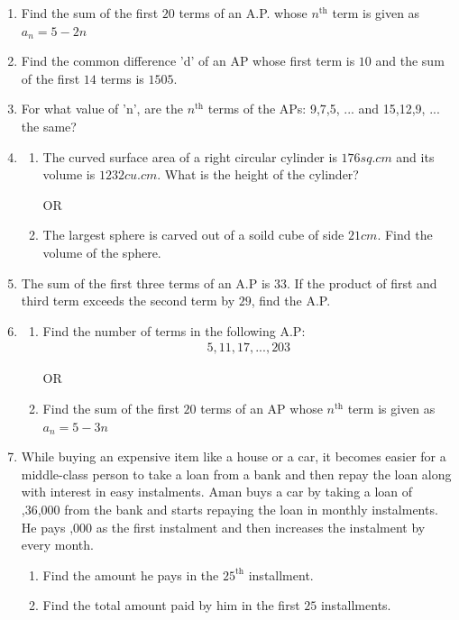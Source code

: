 \documentclass{article}
\begin{document}
\begin{enumerate}
    
        \item Find the sum of the first $20$ terms of an A.P. whose $n^{\text{th}}$ term is given as $a_n=5-2n$
    
    
        \item Find the common difference 'd' of an AP whose first term is $1$0 and the sum of the first $14$ terms is $1505$.

        \item For what value of 'n', are the $n^{\text{th}}$ terms of the APs: 9,7,5, ... and 15,12,9, ... the same?

        \item
        \begin{enumerate}
            \item The curved surface area of a right circular cylinder is $176 sq.cm$ and its volume is $1232cu. cm$. What is the height of the cylinder?
            \begin{center}
            OR
        \end{center} 
        \item The largest sphere is carved out of a soild cube of side $21 cm$. Find the volume of the sphere.
        \end{enumerate}
        \item The sum of the first three terms of an A.P is $33$. If the product of first and third term exceeds the second term by $29$, find the A.P.
            
         \item
        \begin{enumerate}
            \item Find the number of terms in the following A.P:
            \begin{align}
                5,11,17,...,203
            \end{align}
            \begin{center}
            OR
        \end{center} 
        \item Find the sum of the first $20$ terms of an AP whose $n^{\text{th}}$ term is given as $a_n=5-3n$
        \end{enumerate}

        \item While buying an expensive item like a house or a car, it becomes easier for a middle-class person to take a loan from a bank and then repay the loan along with interest in easy instalments. 
        Aman buys a car by taking a loan of ,36,000 from the bank and starts repaying the loan in monthly instalments. He pays ,000 as the first instalment and then increases the instalment by  every month. 
        \begin{enumerate}
        \item Find the amount he pays in the $25^{\text{th}}$ installment.
\item Find the total amount paid by him in the first $25$ installments.
    \end{enumerate} 
       
        \end{enumerate}
    
\end{document}
